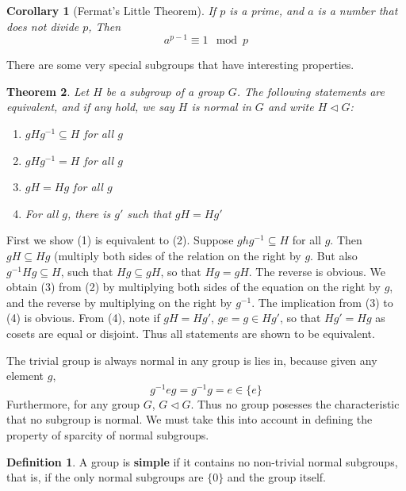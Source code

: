 \documentclass[12pt]{amsbook}
\makeatletter
\theoremstyle{plain}
\newtheorem{theorem}{Theorem}[chapter]
\newtheorem{corollary}[theorem]{Corollary}
\theoremstyle{definition}
\newtheorem{definition}{Definition}
\renewenvironment{proof}[1][\proofname]{\par
  \pushQED{\qed}%
  \normalfont \topsep6\p@\@plus6\p@\relax
  \list{}{\leftmargin=0em
          \rightmargin=\leftmargin
          \settowidth{\itemindent}{\itshape#1}%
          \labelwidth=\itemindent}

  \item[\hskip\labelsep
        \itshape
    #1\@addpunct{.}]\ignorespaces
}{%
  \popQED\endlist\@endpefalse
}
\makeatother
\begin{document}
\begin{corollary}[Fermat's Little Theorem] 
    If $p$ is a prime, and $a$ is a number that does not divide $p$, Then
    \[ a^{p-1} \equiv 1 \mod{p} \]
\end{corollary}

There are some very special subgroups that have interesting properties.

\begin{theorem}
Let $H$ be a subgroup of a group $G$. The following statements are equivalent, and if any hold, we say $H$ is normal in $G$  and write $H \lhd G$:
\begin{enumerate}
    \item $gHg^{-1} \subseteq H$ for all $g$
    \item $gHg^{-1} = H$ for all $g$
    \item $gH = Hg$ for all $g$
    \item For all $g$, there is $g'$ such that $gH = Hg'$
\end{enumerate}
\end{theorem}
\begin{proof}
    First we show (1) is equivalent to (2). Suppose $ghg^{-1} \subseteq H$ for all $g$. Then $gH \subseteq Hg$ (multiply both sides of the relation on the right by $g$. But also $g^{-1}Hg \subseteq H$, such that $Hg \subseteq gH$, so that $Hg = gH$. The reverse is obvious. We obtain (3) from (2) by multiplying both sides of the equation on the right by $g$, and the reverse by multiplying on the right by $g^{-1}$. The implication from (3) to (4) is obvious. From (4), note if $gH = Hg'$, $ge = g \in Hg'$, so that $Hg' = Hg$ as cosets are equal or disjoint. Thus all statements are shown to be equivalent.
\end{proof}

The trivial group is always normal in any group is lies in, because given any element $g$,
%
\[ g^{-1}eg = g^{-1}g = e \in \{e\} \]
%
Furthermore, for any group $G$, $G \lhd G$. Thus no group posesses the characteristic that no subgroup is normal. We must take this into account in defining the property of sparcity of normal subgroups.

\begin{definition}
    A group is {\bf simple}  if it contains no non-trivial normal subgroups, that is, if the only normal subgroups are $\{ 0 \}$ and the group itself.
\end{definition}
\end{document}
